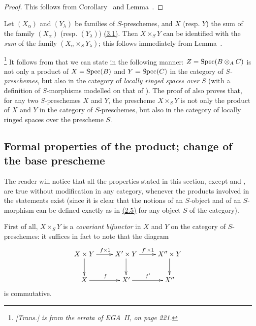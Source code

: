 \begin{proof}
\label{proof-1.3.2.7}
This follows from Corollary~ and Lemma~.
\end{proof}

\begin{env}[3.2.8]
\label{1.3.2.8}
Let $(X_\alpha)$ and $(Y_\lambda)$ be families of $S$-preschemes, and $X$ (resp. $Y$) the sum
of the family $(X_\alpha)$ (resp. $(Y_\lambda)$) \hyperref[subsection:sums-of-preschemes]{(3.1)}. Then $X\times_S Y$ can be identified with
the \emph{sum} of the family $(X_\alpha\times_S Y_\lambda)$; this follows immediately from Lemma~.
\end{env}

\begin{env}[3.2.9]
\label{1.3.2.9}
\footnote{\emph{[Trans.]  is from the errata of EGA~II, on page 221.}}
It follows from  that we can state  in the following
manner: $Z={\mathop{\mathrm{Spec}}\nolimits}(B\otimes_A C)$ is not only a product of $X={\mathop{\mathrm{Spec}}\nolimits}(B)$ and $Y={\mathop{\mathrm{Spec}}\nolimits}(C)$ in the
category of \emph{$S$-preschemes}, but also in the category of \emph{locally ringed spaces
over $S$} (with a definition of $S$-morphisms modelled on that of ). The
proof of  also proves that, for any two $S$-preschemes $X$ and $Y$, the
prescheme $X\times_S Y$ is not only the product of $X$ and $Y$ in the category of
$S$-preschemes, but also in the category of locally ringed spaces over the prescheme $S$.
\end{env}

\subsection{Formal properties of the product; change of the base prescheme}
\label{subsection:product-formal-and-base-change}

\begin{env}[3.3.1]
\label{1.3.3.1}
The reader will notice that all the properties stated in this section, except
 and , are true without modification in any
category, whenever the products involved in the statements exist (since it is
clear that the notions of an $S$-object and of an $S$-morphism can be defined
exactly as in \hyperref[subsection:preschemes-over-prescheme]{(2.5)} for any object $S$ of the category).
\end{env}

\begin{env}[3.3.2]
\label{1.3.3.2}
First of all, $X\times_S Y$ is a \emph{covariant bifunctor} in $X$ and $Y$ on the
category of $S$-preschemes: it suffices in fact to note that the diagram
\[
  \xymatrix{
    X\times Y\ar[r]^{f\times 1}\ar[d] &
    X'\times Y\ar[r]^{f'\times 1}\ar[d] &
    X''\times Y\ar[d]\\
    X\ar[r]^f &
    X'\ar[r]^{f'} &
    X''
  }
\]
is commutative.
\end{env}

